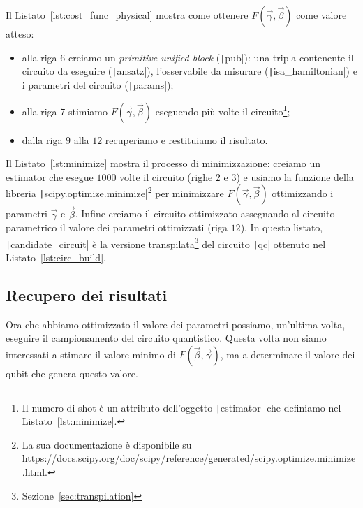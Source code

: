 \begin{listingenv}[h]
	\caption{Stima di $F(\vec{\gamma}, \vec{\beta})$}
	\label{lst:cost_func_physical}
\end{listingenv}

Il Listato~\ref{lst:cost_func_physical} mostra come ottenere $F(\vec{\gamma}, \vec{\beta})$ come valore atteso:
\begin{itemize}
	\item alla riga $6$ creiamo un \emph{primitive unified block} (\texttt|pub|): una tripla contenente il circuito da eseguire (\texttt|ansatz|), l'osservabile da misurare (\texttt|isa_hamiltonian|) e i parametri del circuito (\texttt|params|);
	\item alla riga $7$ stimiamo $F(\vec{\gamma}, \vec{\beta})$ eseguendo più volte il circuito\footnote{Il numero di shot è un attributo dell'oggetto \texttt|estimator| che definiamo nel Listato~\ref{lst:minimize}.};
	\item dalla riga $9$ alla $12$ recuperiamo e restituiamo il risultato.
\end{itemize}

\begin{listingenv}[h]
	\caption{Ottimizzazione di $\vec{\gamma}$ e $\vec{\beta}$}
	\label{lst:minimize}
\end{listingenv}

Il Listato~\ref{lst:minimize} mostra il processo di minimizzazione: creiamo un estimator che esegue $1000$ volte il circuito (righe $2$ e $3$) e usiamo la funzione della libreria \texttt|scipy.optimize.minimize|\footnote{La sua documentazione è disponibile su \url{https://docs.scipy.org/doc/scipy/reference/generated/scipy.optimize.minimize.html}.} per minimizzare $F(\vec{\gamma}, \vec{\beta})$ ottimizzando i parametri $\vec{\gamma}$ e $\vec{\beta}$. Infine creiamo il circuito ottimizzato assegnando al circuito parametrico il valore dei parametri ottimizzati (riga $12$). In questo listato, \texttt|candidate_circuit| è la versione transpilata\footnote{Sezione~\ref{sec:transpilation}} del circuito \texttt|qc| ottenuto nel Listato~\ref{lst:circ_build}.

\subsection{Recupero dei risultati}
Ora che abbiamo ottimizzato il valore dei parametri possiamo, un'ultima volta, eseguire il campionamento del circuito quantistico. Questa volta non siamo interessati a stimare il valore minimo di $F(\vec{\beta}, \vec{\gamma})$, ma a determinare il valore dei qubit che genera questo valore.

